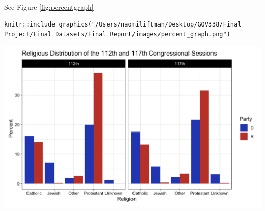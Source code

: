 \documentclass[Royal,times,sageh]{sagej}
\begin{document}
See Figure \ref{fig:percentgraph}

\begin{verbatim}
knitr::include_graphics("/Users/naomiliftman/Desktop/GOV338/Final Project/Final Datasets/Final Report/images/percent_graph.png")
\end{verbatim}

\includegraphics[width=40in]{images/percent_graph}



\end{document}
